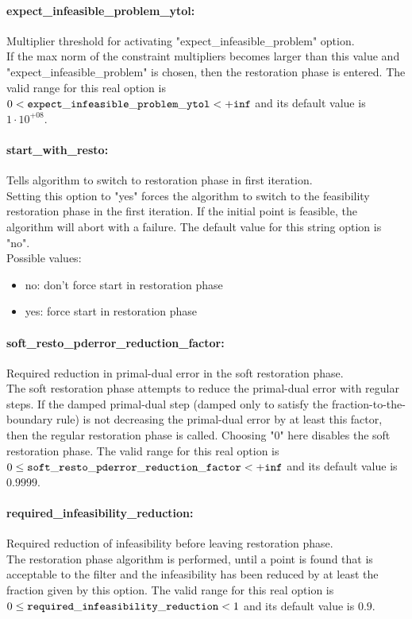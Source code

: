 \paragraph{expect\_infeasible\_problem\_ytol:}\label{opt:expect_infeasible_problem_ytol} Multiplier threshold for activating "expect\_infeasible\_problem" option. \\
 If the max norm of the constraint multipliers becomes larger than this value and "expect\_infeasible\_problem" is chosen, then the restoration phase is entered. The valid range for this real option is 
$0 <  {\tt expect\_infeasible\_problem\_ytol } <  {\tt +inf}$
and its default value is $1 \cdot 10^{+08}$.


\paragraph{start\_with\_resto:}\label{opt:start_with_resto} Tells algorithm to switch to restoration phase in first iteration. \\
 Setting this option to "yes" forces the algorithm to switch to the feasibility restoration phase in the first iteration. If the initial point is feasible, the algorithm will abort with a failure. The default value for this string option is "no".
\\ 
Possible values:
\begin{itemize}
   \item no: don't force start in restoration phase
   \item yes: force start in restoration phase
\end{itemize}

\paragraph{soft\_resto\_pderror\_reduction\_factor:}\label{opt:soft_resto_pderror_reduction_factor} Required reduction in primal-dual error in the soft restoration phase. \\
 The soft restoration phase attempts to reduce the primal-dual error with regular steps. If the damped primal-dual step (damped only to satisfy the fraction-to-the-boundary rule) is not decreasing the primal-dual error by at least this factor, then the regular restoration phase is called. Choosing "0" here disables the soft restoration phase. The valid range for this real option is 
$0 \le {\tt soft\_resto\_pderror\_reduction\_factor } <  {\tt +inf}$
and its default value is $0.9999$.


\paragraph{required\_infeasibility\_reduction:}\label{opt:required_infeasibility_reduction} Required reduction of infeasibility before leaving restoration phase. \\
 The restoration phase algorithm is performed, until a point is found that is acceptable to the filter and the infeasibility has been reduced by at least the fraction given by this option. The valid range for this real option is 
$0 \le {\tt required\_infeasibility\_reduction } <  1$
and its default value is $0.9$.


